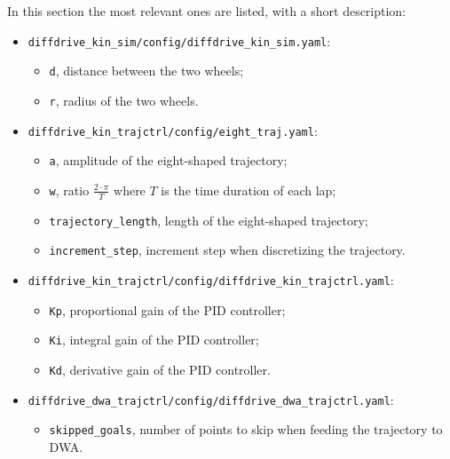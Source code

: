 \documentclass[11pt,a4paper]{article}
\begin{document}
In this section the most relevant ones are listed, with a short description:\\
\begin{itemize}

    \item \texttt{diffdrive\_kin\_sim/config/diffdrive\_kin\_sim.yaml}:
        \begin{itemize}
            \item \texttt{d}, distance between the two wheels;
            \item \texttt{r}, radius of the two wheels.\\
        \end{itemize}

    \item \texttt{diffdrive\_kin\_trajctrl/config/eight\_traj.yaml}:
        \begin{itemize}
            \item \texttt{a}, amplitude of the eight-shaped trajectory;
            \item \texttt{w}, ratio $\frac{2 \cdot \pi }{T}$ where $T$ is the time duration of each lap;
            \item \texttt{trajectory\_length}, length of the eight-shaped trajectory;
            \item \texttt{increment\_step}, increment step when discretizing the trajectory.\\
        \end{itemize}

    \item \texttt{diffdrive\_kin\_trajctrl/config/diffdrive\_kin\_trajctrl.yaml}:
        \begin{itemize}
            \item \texttt{Kp}, proportional gain of the PID controller;
            \item \texttt{Ki}, integral gain of the PID controller;
            \item \texttt{Kd}, derivative gain of the PID controller.\\
        \end{itemize}

    \item \texttt{diffdrive\_dwa\_trajctrl/config/diffdrive\_dwa\_trajctrl.yaml}:
        \begin{itemize}
            \item \texttt{skipped\_goals}, number of points to skip when feeding the trajectory to DWA.\\
        \end{itemize}


\end{itemize}
\end{document}
